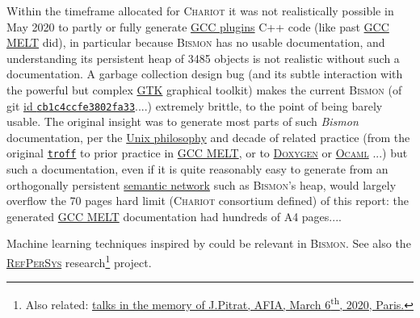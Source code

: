 Within the timeframe allocated for \textsc{Chariot} it was not
realistically possible in May 2020 to partly or fully generate
\href{https://gcc.gnu.org/onlinedocs/gccint/Plugins.html}{GCC plugins}
C++ code (like past
\href{http://starynkevitch.net/Basile/gcc-melt/}{GCC MELT} did), in
particular because \textsc{Bismon} has no usable documentation, and
understanding its persistent heap of 3485 objects is not realistic
without such a documentation. A garbage collection
\cite{Jones:2016:GC-handbook} design bug (and its subtle interaction
with the powerful but complex \href{https://www.gtk.org/}{GTK}
graphical toolkit) makes the current \textsc{Bismon} (of git
\href{https://github.com/bstarynk/bismon/commit/cb1c4ccfe3802fa330d48fc97c2913943736ba2f}{id
  \texttt{cb1c4ccfe3802fa33}}....) extremely brittle, to the point of
being barely usable. The original insight was to generate most parts
of such \emph{Bismon} documentation, per the
\href{https://en.wikipedia.org/wiki/Unix_philosophy}{Unix philosophy}
and decade of related practice (from the original
\href{https://www.troff.org/}{\texttt{troff}} to prior practice in
\href{http://starynkevitch.net/Basile/gcc-melt/}{GCC MELT}, or to
\href{https://www.doxygen.nl/}{\textsc{Doxygen}} or
\href{http://ocaml.org/}{\textsc{Ocaml}} ...) but such a
documentation, even if it is quite reasonably easy to generate from an
orthogonally persistent
\href{https://en.wikipedia.org/wiki/Semantic_network}{semantic
  network} such as \textsc{Bismon}'s heap, would largely overflow the
70 pages hard limit (\textsc{Chariot} consortium defined) of this
report: the generated
\href{http://starynkevitch.net/Basile/gcc-melt/}{GCC MELT}
documentation had hundreds of A4 pages....

Machine learning techniques inspired by \cite{zhang:2019:learned}
could be relevant in \textsc{Bismon}. See also the
\href{http://refpersys.org/}{\textsc{RefPerSys}}
research\footnote{Also related:
\href{https://afia.asso.fr/journee-hommage-j-pitrat/}{talks in the
  memory of J.Pitrat, AFIA, March 6\textsuperscript{th}, 2020,
  Paris.}} project.

\medskip

